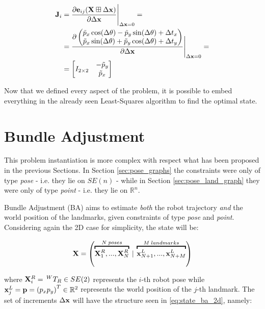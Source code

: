 \begin{align}
    \mathbf{J}_i &= \frac{\partial \mathbf{e}_{ij}(\mathbf{X} \boxplus \Delta \mathbf{x})}{\partial \Delta \mathbf{x}} \Bigg \rvert_{\Delta \mathbf{x} = 0} = \nonumber \\
    &= \frac{\partial\begin{pmatrix}
            \tilde{p}_x\cos(\Delta\theta) - \tilde{p}_y\sin(\Delta\theta) + \Delta t_x \\
            \tilde{p}_x\sin(\Delta\theta) + \tilde{p}_y\cos(\Delta\theta) + \Delta t_y
        \end{pmatrix}}{\partial\Delta \mathbf{x}} \Bigg \rvert_{\Delta \mathbf{x} = 0} = \nonumber \\
    &= \begin{bmatrix}
            I_{2 \times 2} & \begin{matrix} -\tilde{p}_y \\ \tilde{p}_x\end{matrix}
    \end{bmatrix}
    \label{eq:jacobian_r2}
\end{align}

Now that we defined every aspect of the problem, it is possible to embed everything in the already seen Least-Squares algorithm to find the optimal state.

\section{Bundle Adjustment}\label{sec:bundle_adjustment_problem}
This problem instantiation is more complex with respect what has been proposed in the previous Sections. In Section \ref{sec:pose_graphs} the constraints were only of type \textit{pose} - i.e. they lie on $SE(n)$ - while in Section \ref{sec:pose_land_graph} they were only of type \textit{point} - i.e. they lie on $\mathbb{R}^n$.

Bundle Adjustment (BA) aims to estimate \textit{both} the robot trajectory \textit{and} the world position of the landmarks, given constraints of type \textit{pose} and \textit{point}. Considering again the 2D case for simplicity, the state will be:

\begin{equation}
    \SState = \left(\overbracket{\SState^R_1, ..., \SState^R_N}^{N \;poses}\: |\: \overbracket{\state^L_{N+1}, ..., \state^L_{N+M}}^{M \;landmarks}\right)
    \label{eq:state_ba_2d}
\end{equation}

\noindent where $\mathbf{X}^R_i = \,^{W}T_{R} \in SE(2)$ represents the $i$-th robot pose while $\mathbf{x}^L_j = \mathbf{p} = \left(p_x p_y\right)^T \in \mathbb{R}^2$ represents the world position of the $j$-th landmark. The set of increments $\Delta \mathbf{x}$ will have the structure seen in \ref{eq:state_ba_2d}, namely:

